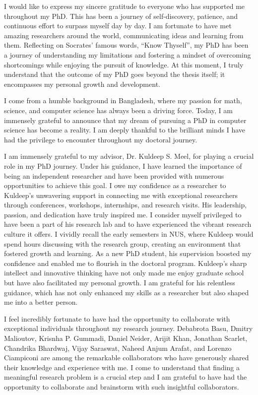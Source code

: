 \begin{acknowledgments}
	
I would like to express my sincere gratitude to everyone who has supported me throughout my PhD. This has been a journey of self-discovery, patience, and continuous effort to surpass myself day by day. I am fortunate to have met amazing researchers around the world, communicating ideas and learning from them. Reflecting on Socrates' famous words, ``Know Thyself'', my PhD has been a journey of understanding my limitations and fostering a mindset of overcoming shortcomings while enjoying the pursuit of knowledge. At this moment, I truly understand that the outcome of my PhD goes beyond the thesis itself; it encompasses my personal growth and development.


I come from a humble background in Bangladesh, where my passion for math, science, and computer science has always been a driving force. Today, I am immensely grateful to announce that my dream of pursuing a PhD in computer science has become a reality. I am deeply thankful to the brilliant minds I have had the privilege to encounter throughout my doctoral journey.

I am immensely grateful to my advisor, Dr. Kuldeep S. Meel, for playing a crucial role in my PhD journey. Under his guidance, I have learned the importance of being an independent researcher and have been provided with numerous opportunities to achieve this goal. I owe my confidence as a researcher to Kuldeep's unwavering support in connecting me with exceptional researchers through conferences, workshops, internships, and research visits. His leadership, passion, and dedication have truly inspired me. I consider myself privileged to have been a part of his research lab and to have experienced the vibrant research culture it offers. I vividly recall the early semesters in NUS, where Kuldeep would spend hours discussing with the research group, creating an environment that fostered growth and learning. As a new PhD student, his supervision boosted my confidence and enabled me to flourish in the doctoral program. Kuldeep's sharp intellect and innovative thinking have not only made me enjoy graduate school but have also facilitated my personal growth. I am grateful for his relentless guidance, which has not only enhanced my skills as a researcher but also shaped me into a better person.


I feel incredibly fortunate to have had the opportunity to collaborate with exceptional individuals throughout my research journey. Debabrota Basu, Dmitry Malioutov, Krisnha P. Gummadi, Daniel Neider, Arijit Khan, Jonathan Scarlet, Chandrika Bhardwaj, Vijay Saraswat, Naheed Anjum Arafat, and Lorenzo Ciampiconi are among the remarkable collaborators who have generously shared their knowledge and experience with me. I come to understand that finding a meaningful research problem is a crucial step and I am grateful to have had the opportunity to collaborate and brainstorm with such insightful collaborators.



\end{acknowledgments}
